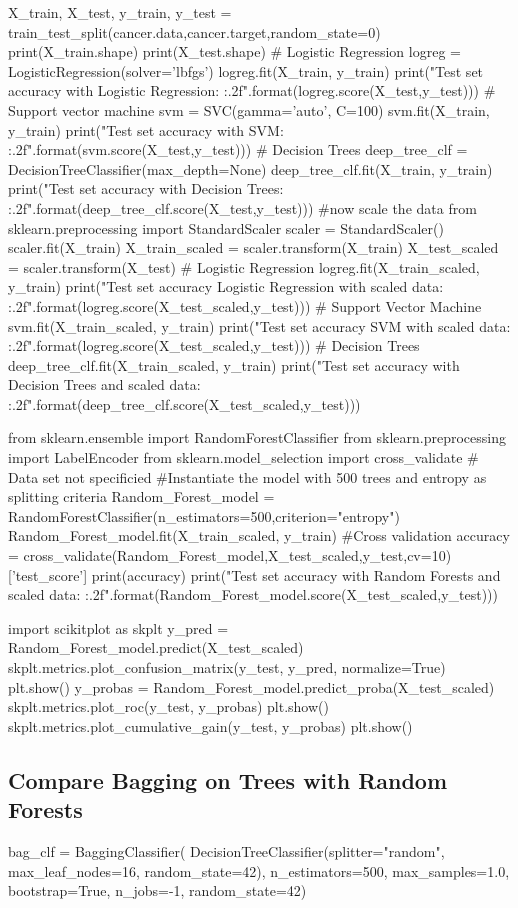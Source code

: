 \documentclass[%
oneside,                 %
final,                   %
10pt]{article}
\begin{document}
X_train, X_test, y_train, y_test = train_test_split(cancer.data,cancer.target,random_state=0)
print(X_train.shape)
print(X_test.shape)
# Logistic Regression
logreg = LogisticRegression(solver='lbfgs')
logreg.fit(X_train, y_train)
print("Test set accuracy with Logistic Regression: {:.2f}".format(logreg.score(X_test,y_test)))
# Support vector machine
svm = SVC(gamma='auto', C=100)
svm.fit(X_train, y_train)
print("Test set accuracy with SVM: {:.2f}".format(svm.score(X_test,y_test)))
# Decision Trees
deep_tree_clf = DecisionTreeClassifier(max_depth=None)
deep_tree_clf.fit(X_train, y_train)
print("Test set accuracy with Decision Trees: {:.2f}".format(deep_tree_clf.score(X_test,y_test)))
#now scale the data
from sklearn.preprocessing import StandardScaler
scaler = StandardScaler()
scaler.fit(X_train)
X_train_scaled = scaler.transform(X_train)
X_test_scaled = scaler.transform(X_test)
# Logistic Regression
logreg.fit(X_train_scaled, y_train)
print("Test set accuracy Logistic Regression with scaled data: {:.2f}".format(logreg.score(X_test_scaled,y_test)))
# Support Vector Machine
svm.fit(X_train_scaled, y_train)
print("Test set accuracy SVM with scaled data: {:.2f}".format(logreg.score(X_test_scaled,y_test)))
# Decision Trees
deep_tree_clf.fit(X_train_scaled, y_train)
print("Test set accuracy with Decision Trees and scaled data: {:.2f}".format(deep_tree_clf.score(X_test_scaled,y_test)))


from sklearn.ensemble import RandomForestClassifier
from sklearn.preprocessing import LabelEncoder
from sklearn.model_selection import cross_validate
# Data set not specificied
#Instantiate the model with 500 trees and entropy as splitting criteria
Random_Forest_model = RandomForestClassifier(n_estimators=500,criterion="entropy")
Random_Forest_model.fit(X_train_scaled, y_train)
#Cross validation
accuracy = cross_validate(Random_Forest_model,X_test_scaled,y_test,cv=10)['test_score']
print(accuracy)
print("Test set accuracy with Random Forests and scaled data: {:.2f}".format(Random_Forest_model.score(X_test_scaled,y_test)))


import scikitplot as skplt
y_pred = Random_Forest_model.predict(X_test_scaled)
skplt.metrics.plot_confusion_matrix(y_test, y_pred, normalize=True)
plt.show()
y_probas = Random_Forest_model.predict_proba(X_test_scaled)
skplt.metrics.plot_roc(y_test, y_probas)
plt.show()
skplt.metrics.plot_cumulative_gain(y_test, y_probas)
plt.show()

\epycod


\subsection{Compare  Bagging on Trees with Random Forests}
\bpycod
bag_clf = BaggingClassifier(
    DecisionTreeClassifier(splitter="random", max_leaf_nodes=16, random_state=42),
    n_estimators=500, max_samples=1.0, bootstrap=True, n_jobs=-1, random_state=42)
\epycod
\end{document}
